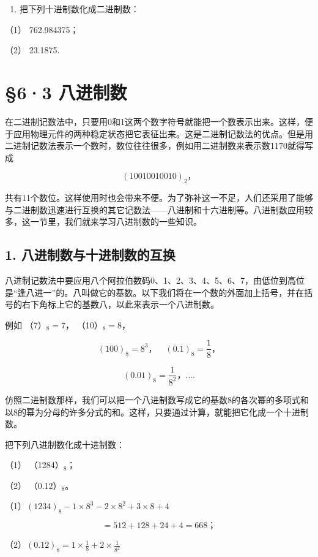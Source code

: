 \begin{enumerate}[start=3]
\item
  把下列十进制数化成二进制数：
\end{enumerate}

（1） 762.984375；

（2） 23.1875.

\section{§6·3 八进制数}

在二进制记数法中，只要用0和1这两个数字符号就能把一个数表示出来。这样，便于应用物理元件的两种稳定状态把它表征出来。这是二进制记数法的优点。但是用二进制记数法表示一个数时，数位往往很多，例如用二进制数来表示数1170就得写成

\[
(10010010010) _{2}\text{，}
\]

共有11个数位。这样使用时也会带来不便。为了弥补这一不足，人们还采用了能够与二进制数迅速进行互换的其它记数法------八进制和十六进制等。八进制数应用较多，这一节里，我们就来学习八进制数的一些知识。

\subsection{1. 八进制数与十进制数的互换}

八进制记数法中要应用八个阿拉伯数码0、1、2、3、4、5、6、7，由低位到高位是``逢八进一''的。八叫做它的基数。以下我们将在一个数的外面加上括号，并在括号的右下角标上它的基数八，以此来表示一个八进制数。

例如 （7）\(_{8}=7\)， （10）\(_{8}=8\)，

\[
(100) _{8} = 8 ^{3}\text{，} \quad (0.1) _{8} = \frac{1}{8}\text{，}
\]

\[
(0.01) _{8} = \frac{1}{8 ^{2}}\text{，} \dots .
\]

仿照二进制数那样，我们可以把一个八进制数写成它的基数8的各次幂的多项式和以8的幂为分母的许多分式的和。这样，只要通过计算，就能把它化成一个十进制数。

 把下列八进制数化成十进制数：

（1） （1284）\(_{8}\)；

（2） （0.12）\(_{8}\)。


（1）\((1234)_{8} - 1 \times 8^{3} - 2 \times 8^{2} + 3 \times 8 + 4\)

\[
= 512 + 128 + 24 + 4 = 668\text{；}
\]

（2）\((0.12)_{8} = 1 \times \frac{1}{8} + 2 \times \frac{1}{8^{2}}\)

